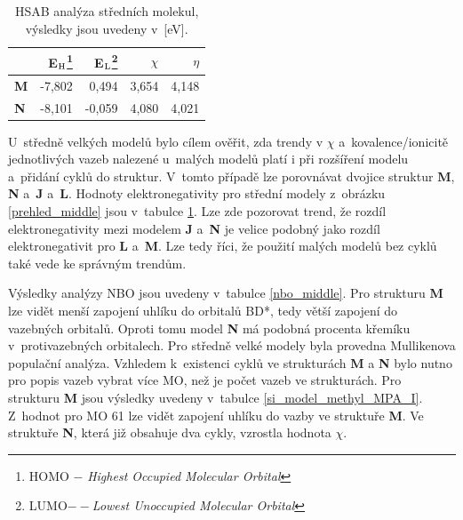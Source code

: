 \documentclass[
digital, %
table,   %
nolof,     %
nolot,     %
oneside,
]{fithesis3}
\begin{document}
\begin{table}[H]
\begin{minipage}{\textwidth}
\caption{HSAB analýza středních molekul, výsledky jsou uvedeny v~[eV].}
\begin{center}
\begin{tabular}{|l|r|r|r|r|}
\hline
\label{hsab_middle}& E$_{\ce{H}}$\footnote{HOMO $-$ \textit{Highest Occupied Molecular Orbital}}  & E$_{\ce{L}}$\footnote{LUMO$ -- $\textit{Lowest Unoccupied Molecular Orbital}} & $\chi$  & $\eta$ \\ \hline
\textbf{M} & -7,802 & 0,494 & 3,654 & 4,148 \\ \hline
\textbf{N} & -8,101 & -0,059 & 4,080 & 4,021 \\ \hline
\end{tabular}
\end{center}
\end{minipage}
\end{table}

U~středně velkých modelů bylo cílem ověřit, zda trendy v $\chi$ a~kovalence/ionicitě jednotlivých vazeb nalezené u~malých modelů platí i při rozšíření modelu a~přidání cyklů do struktur. V~tomto případě lze porovnávat dvojice struktur \textbf{M}, \textbf{N} a~\textbf{J} a~\textbf{L}. Hodnoty elektronegativity pro střední modely z~obrázku \ref{prehled_middle} jsou v~tabulce \ref{hsab_middle}. Lze zde pozorovat trend, že rozdíl elektronegativity mezi modelem \textbf{J} a~\textbf{N} je velice podobný jako rozdíl elektronegativit pro \textbf{L} a~\textbf{M}. Lze tedy říci, že použití malých modelů bez cyklů také vede ke správným trendům.

Výsledky analýzy NBO jsou uvedeny v~tabulce \ref{nbo_middle}. Pro strukturu \textbf{M} lze vidět menší zapojení uhlíku do orbitalů BD*, tedy větší zapojení do vazebných orbitalů. Oproti tomu model \textbf{N} má podobná procenta křemíku v~protivazebných orbitalech. Pro středně velké modely byla provedna Mullikenova populační analýza. Vzhledem k~existenci cyklů ve strukturách \textbf{M} a \textbf{N} bylo nutno pro popis vazeb vybrat více MO, než je počet vazeb ve strukturách. Pro strukturu \textbf{M} jsou výsledky uvedeny v~tabulce \ref{si_model_methyl_MPA_I}. Z~hodnot pro MO 61 lze vidět zapojení uhlíku do vazby ve struktuře \textbf{M}. Ve struktuře \textbf{N}, která již obsahuje dva cykly, vzrostla hodnota $\chi$.
\end{document}
